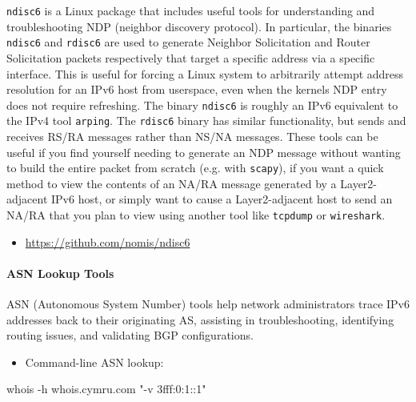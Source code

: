 \documentclass[
]{article}
\newenvironment{Shaded}{}{}
\newcommand{\AttributeTok}[1]{\textcolor[rgb]{0.49,0.56,0.16}{#1}}
\newcommand{\ExtensionTok}[1]{#1}
\newcommand{\NormalTok}[1]{#1}
\newcommand{\StringTok}[1]{\textcolor[rgb]{0.25,0.44,0.63}{#1}}
\providecommand{\tightlist}{%
  \setlength{\itemsep}{0pt}\setlength{\parskip}{0pt}}
\begin{document}
\texttt{ndisc6} is a Linux package that includes useful tools for
understanding and troubleshooting NDP (neighbor discovery protocol). In
particular, the binaries \texttt{ndisc6} and \texttt{rdisc6} are used to
generate Neighbor Solicitation and Router Solicitation packets
respectively that target a specific address via a specific interface.
This is useful for forcing a Linux system to arbitrarily attempt address
resolution for an IPv6 host from userspace, even when the
kernel\textquotesingle s NDP entry does not require refreshing. The
binary \texttt{ndisc6} is roughly an IPv6 equivalent to the IPv4 tool
\texttt{arping}. The \texttt{rdisc6} binary has similar functionality,
but sends and receives RS/RA messages rather than NS/NA messages. These
tools can be useful if you find yourself needing to generate an NDP
message without wanting to build the entire packet from scratch (e.g.
with \texttt{scapy}), if you want a quick method to view the contents of
an NA/RA message generated by a Layer2-adjacent IPv6 host, or simply
want to cause a Layer2-adjacent host to send an NA/RA that you plan to
view using another tool like \texttt{tcpdump} or \texttt{wireshark}.

\begin{itemize}
\tightlist
\item
  \href{https://github.com/nomis/ndisc6}{\url{https://github.com/nomis/ndisc6}}
\end{itemize}

\paragraph{ASN Lookup Tools}\label{asn-lookup-tools}

ASN (Autonomous System Number) tools help network administrators trace
IPv6 addresses back to their originating AS, assisting in
troubleshooting, identifying routing issues, and validating BGP
configurations.

\begin{itemize}
\tightlist
\item
  Command-line ASN lookup:
\end{itemize}

\begin{Shaded}
\begin{Highlighting}[]
\ExtensionTok{whois} \AttributeTok{{-}h}\NormalTok{ whois.cymru.com }\StringTok{"{-}v 3fff:0:1::1"}
\end{Highlighting}
\end{Shaded}
\end{document}

